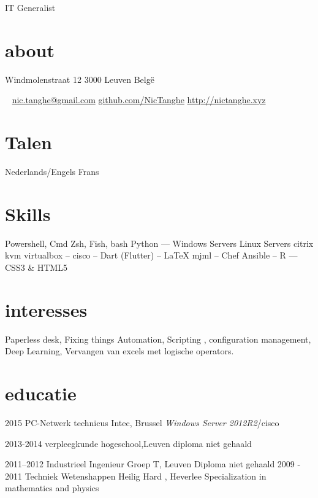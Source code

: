 \documentclass[]{friggeri-cv}
\begin{document}
       {IT Generalist}


\begin{aside}
  \section{about}
    Windmolenstraat 12
    3000 Leuven
    Belgë

    ~
    \href{nic.tanghe@gmail.com}{nic.tanghe@gmail.com}
    \href{https://github.com/NicTanghe}{github.com/NicTanghe}
    \href{http://nictanghe.xyz}{http://nictanghe.xyz}
    \section{Talen}
    Nederlands/Engels
    Frans
    \section{Skills}
    Powershell, Cmd
    Zsh, Fish, bash
    Python 
    ---
    Windows Servers
    Linux Servers
    citrix
    kvm
    virtualbox
    --
    cisco
    --
    Dart
    (Flutter)
    --
    \LaTeX
    mjml
    --
    Chef
    Ansible
    --
     \CC R
    ---
    CSS3 \& HTML5
  \end{aside}
    
\section{interesses}

Paperless desk, Fixing things Automation, Scripting , configuration management,
Deep Learning, Vervangen van excels met logische operators.

\section{educatie}

\begin{entrylist}

  \entry
    {2015}
    {PC-Netwerk technicus}
    {Intec, Brussel}
    {\emph {Windows Server 2012R2}/cisco }


  \entry
    {2013-2014}
    {verpleegkunde}
    {hogeschool,Leuven}
    {diploma niet gehaald}

  \entry
    {2011–2012}
    {Industrieel Ingenieur}
    {Groep T, Leuven}
    {Diploma niet gehaald}
  \entry
    {2009 - 2011}
    {Techniek Wetenshappen}
    {Heilig Hard , Heverlee}
    {Specialization in mathematics and physics}
\end{entrylist}
\end{document}
